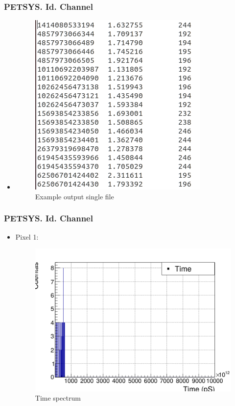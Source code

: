 \documentclass{beamer}
\begin{document}
\begin{frame}
\frametitle{PETSYS. Id. Channel}
\begin{itemize}
\item{}

\begin{figure}[hbtp]
\centering
\includegraphics[scale=0.5]{PETSYS/Id_channel/Example_singles_PETSYS.png}
\caption{Example output single file}
\end{figure}

\end{itemize}

\end{frame}

\begin{frame}
\frametitle{PETSYS. Id. Channel}
\begin{itemize}
\item{} Pixel 1:

\begin{figure}[hbtp]
\centering
\includegraphics[scale=0.25]{PETSYS/Id_channel/time_spectrum_pixel_1.png}
\caption{Time spectrum}
\end{figure}

\end{itemize}

\end{frame}
\end{document}
